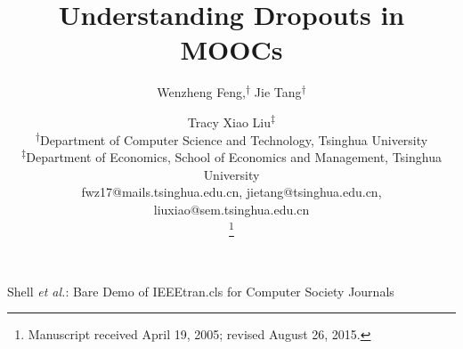 \documentclass[10pt,journal,compsoc]{IEEEtran}
\begin{document}
\title{Understanding Dropouts in MOOCs}
\author{Wenzheng Feng,\textsuperscript{$\dagger$} Jie Tang\textsuperscript{$\dagger$} \and Tracy Xiao Liu\textsuperscript{$\ddagger$} \\ 
	\textsuperscript{$\dagger$}Department of Computer Science and Technology, Tsinghua University \\
\textsuperscript{$\ddagger$}Department of Economics, School of Economics and Management, Tsinghua University\\
fwz17@mails.tsinghua.edu.cn, jietang@tsinghua.edu.cn, liuxiao@sem.tsinghua.edu.cn

\thanks{Manuscript received April 19, 2005; revised August 26, 2015.}}

%
{Shell \MakeLowercase{\textit{et al.}}: Bare Demo of IEEEtran.cls for Computer Society Journals}




	\maketitle
	
    
%	
    
    
     
     
     
     
     
		

	
	
\end{document}
